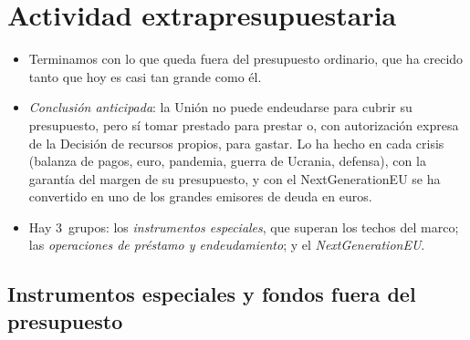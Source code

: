 \documentclass[11pt]{article}
\begin{document}
\section{Actividad extrapresupuestaria}\label{sec:extra}

\begin{itemize}
\item Terminamos con lo que queda fuera del presupuesto ordinario, que ha crecido tanto que hoy es casi tan grande como él.
\item \emph{Conclusión anticipada}: la Unión no puede endeudarse para cubrir su presupuesto, pero sí tomar prestado para prestar o, con autorización expresa de la Decisión de recursos propios, para gastar. Lo ha hecho en cada crisis (balanza de pagos, euro, pandemia, guerra de Ucrania, defensa), con la garantía del margen de su presupuesto, y con el NextGenerationEU se ha convertido en uno de los grandes emisores de deuda en euros.
\item Hay 3~grupos: los \emph{instrumentos especiales}, que superan los techos del marco; las \emph{operaciones de préstamo y endeudamiento}; y el \emph{NextGenerationEU}.
\end{itemize}

\subsection{Instrumentos especiales y fondos fuera del presupuesto}\label{sec:especiales}
\end{document}

